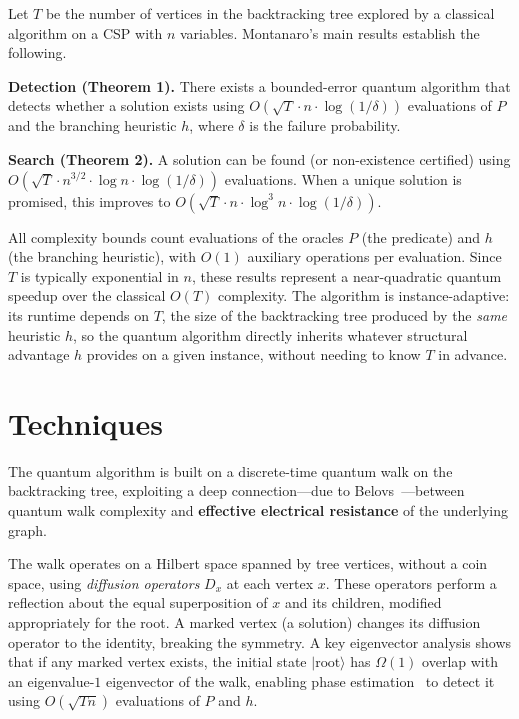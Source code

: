 \documentclass[11pt,a4paper]{article}
\begin{document}
Let $T$ be the number of vertices in the backtracking tree explored by a classical algorithm on a CSP with $n$ variables. Montanaro's main results establish the following.

\textbf{Detection (Theorem 1).} There exists a bounded-error quantum algorithm that detects whether a solution exists using $O(\sqrt{T}\cdot n \cdot \log(1/\delta))$ evaluations of $P$ and the branching heuristic $h$, where $\delta$ is the failure probability.

\textbf{Search (Theorem 2).} A solution can be found (or non-existence certified) using $O(\sqrt{T} \cdot n^{3/2} \cdot \log n \cdot \log(1/\delta))$ evaluations. When a unique solution is promised, this improves to $O(\sqrt{T} \cdot n \cdot \log^3 n \cdot \log(1/\delta))$.

All complexity bounds count evaluations of the oracles $P$ (the predicate) and $h$ (the branching heuristic), with $O(1)$ auxiliary operations per evaluation. Since $T$ is typically exponential in $n$, these results represent a near-quadratic quantum speedup over the classical $O(T)$ complexity. The algorithm is instance-adaptive: its runtime depends on $T$, the size of the backtracking tree produced by the \emph{same} heuristic $h$, so the quantum algorithm directly inherits whatever structural advantage $h$ provides on a given instance, without needing to know $T$ in advance.

\section{Techniques}

The quantum algorithm is built on a discrete-time quantum walk on the backtracking tree, exploiting a deep connection---due to Belovs~\cite{belovs2013,belovs2013b}---between quantum walk complexity and \textbf{effective electrical resistance} of the underlying graph.

The walk operates on a Hilbert space spanned by tree vertices, without a coin space, using \emph{diffusion operators} $D_x$ at each vertex $x$. These operators perform a reflection about the equal superposition of $x$ and its children, modified appropriately for the root. A marked vertex (a solution) changes its diffusion operator to the identity, breaking the symmetry. A key eigenvector analysis shows that if any marked vertex exists, the initial state $|\text{root}\rangle$ has $\Omega(1)$ overlap with an eigenvalue-$1$ eigenvector of the walk, enabling phase estimation~\cite{cleve1998} to detect it using $O(\sqrt{Tn})$ evaluations of $P$ and $h$.
\end{document}
